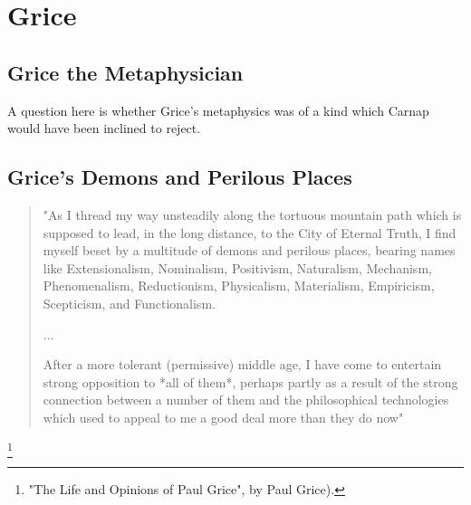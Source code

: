 \documentclass[10pt,titlepage]{book}
\newcommand{\ignore}[1]{}
\begin{document}
\ignore{
This is loose Grice. He thinks Gettier etc are too rigid. We  
know more than we care to admit. A schoolboy knows that the battle of 
Trafalgar  was in 1811, etc. So no need to be Phyrronian. I see Jones's pdf. has a 
section  on my favourite philosopher of Antiquity: Phyrro, and so I'm ready 
to  distinguish between good and bad sceptics. They were all good, honest 
people in  fact. I think it's the French philosophers, Voltaire, etc. who gave 
scepticism a  bad name.
}

\ignore{
\subection{Reductionism}

One of Grice's B\^etes Noires is reductionism, but his gripe is about a particular kind of reductive analysis, not necessarily everything which might be called reductionism.
}

\chapter{Grice}

\section{Grice the Metaphysician}

A question here is whether Grice's metaphysics was of a kind which Carnap would have been inclined to reject.

\section{Grice's Demons and Perilous Places}

\begin{quote}
"As I thread my way unsteadily along the   tortuous mountain 
path which is supposed to lead, in the long  distance,  
to the City of Eternal Truth, I find myself beset by a  
multitude of demons and perilous places, bearing names like  
Extensionalism, Nominalism, Positivism, Naturalism, Mechanism,  
Phenomenalism, Reductionism, Physicalism, Materialism,  
Empiricism, Scepticism, and Functionalism. 

...

After a more tolerant (permissive)  middle age, I have come to  
entertain strong opposition to *all of them*, 
perhaps partly as a result of the strong connection between a  number 
of them and the philosophical technologies which used to appeal  
to me a good deal more than they do  now"
\end{quote}
\footnote{"The Life and Opinions of Paul Grice", by Paul Grice).}
\end{document}
